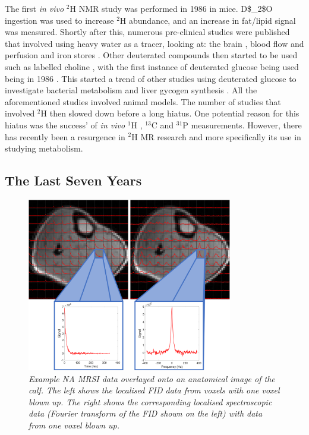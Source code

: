 The first \textit{in vivo} $^2$H NMR study was performed in 1986 \cite{Brereton1986PreliminarySpectroscopy} in mice. \Ac{D$_2$O} ingestion was used to increase $^2$H abundance, and an increase in fat/lipid signal was measured. Shortly after this, numerous pre-clinical studies were published that involved using heavy water as a tracer, looking at: the brain \cite{Ewy1988DeuteriumSitu}, blood flow and perfusion \cite{Ackerman1987DeuteriumTracer.} and iron stores \cite{Irving1987InSpectroscopy}. Other deuterated compounds then started to be used such as labelled choline \cite{Eng1990RenalStudy}, with the first instance of deuterated glucose being used being in 1986 \cite{Barrow1986NMRMobilis}. This started a trend of other studies using deuterated glucose to investigate bacterial metabolism \cite{Aguayo1988HighMetabolism.} and liver gycogen synthesis \cite{Goodman1989UseSynthesis}. All the aforementioned studies involved animal models. The number of studies that involved $^2$H then slowed down before a long hiatus. One potential reason for this hiatus was the success' of \textit{in vivo} $^1$H \cite{Harada1984IdentificationScience}, $^{13}$C \cite{Cohen1980UseLiver} and $^{31}$P \cite{Sappey-Marinier1992EffectSpectroscopy} measurements. However, there has recently been a resurgence in $^2$H MR research and more specifically its use in studying metabolism.

\subsection{The Last Seven Years}

\begin{figure}[H]
    \centering
    \includegraphics[width=0.8\textwidth]{Figures/Intro/CSI.png}
    \caption{\textit{Example \ac{NA} \ac{MRSI} data overlayed onto an anatomical image of the calf. The left shows the localised \ac{FID} data from voxels with one voxel blown up. The right shows the corresponding localised spectroscopic data (Fourier transform of the \ac{FID} shown on the left) with data from one voxel blown up.}}
    \label{fig:intro:CSI}
\end{figure}

